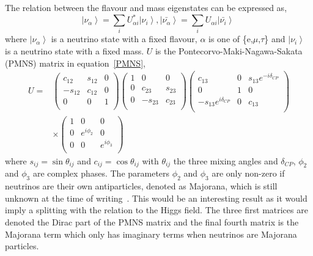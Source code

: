 The relation between the flavour and mass eigenstates can be expressed as,
\begin{equation}
\label{eq:eigenstates}
 \left| \nu_\alpha \right\rangle = \sum_{i} U^{*}_{\alpha i} \left| \nu_i \right\rangle,
 \left| \bar{\nu_\alpha} \right\rangle = \sum_{i} U_{\alpha i} \left| \bar{\nu_i} \right\rangle\
 \end{equation}
where
 $\left| \nu_\alpha \right\rangle $ is a neutrino state with a fixed flavour, $\alpha$ is one of \{e,$\mu$,$\tau$\} and  $\left| \nu_i \right\rangle$ is a neutrino state with a fixed mass.
$U$ is the Pontecorvo-Maki-Nagawa-Sakata (PMNS) matrix in equation~\eqref{PMNS},
\begin{equation}
\label{PMNS}
\begin{aligned}
U ={} & 
 \begin{pmatrix}
 c_{12} & s_{12} & 0\\
  -s_{12} & c_{12} & 0\\
  0 & 0 & 1\\
 \end{pmatrix} 
  \begin{pmatrix}
 1 & 0 & 0\\
  0 & c_{23} & s_{23}\\
  0 & -s_{23} & c_{23}\\
 \end{pmatrix} 
   \begin{pmatrix}
 c_{13} & 0 & s_{13}e^{-i\delta_{CP}}\\
  0 & 1 & 0\\
  -s_{13}e^{i\delta_{CP}} & 0 & c_{13}\\
 \end{pmatrix} 
 \\
 & \times
  \begin{pmatrix}
1 & 0& 0\\
  0 & e^{i\phi_2} & 0\\
  0 & 0 & e^{i\phi_3}\\
 \end{pmatrix} 
 \end{aligned}
\end{equation}
where $s_{ij} = \sin\theta_{ij}$ and $c_{ij} = \cos\theta_{ij}$ with $\theta_{ij}$ the three mixing angles and $\delta_{CP}$, $\phi_2$ and $\phi_3$ are complex phases. The parameters $\phi_2$ and $\phi_3$ are only non-zero if neutrinos are their own antiparticles, denoted as Majorana, which is still unknown at the time of writing~\cite{13PDG}. This would be an interesting result as it would imply a splitting with the relation to the Higgs field. The three first matrices are denoted the Dirac part of the PMNS matrix and the final fourth matrix is the Majorana term which only has imaginary terms when neutrinos are Majorana particles.

